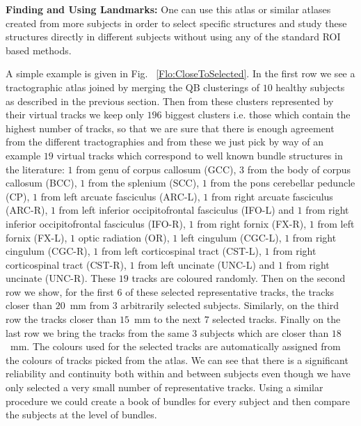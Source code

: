 \documentclass[preprint,authoryear,a4paper,10pt,onecolumn]{elsarticle}
\begin{document}
\textbf{Finding and Using Landmarks:} One can use this atlas or similar
atlases created from more subjects in order to select specific
structures and study these structures directly in different subjects
without using any of the standard ROI based methods.

A simple example is given in Fig. ~\ref{Flo:CloseToSelected}. In the
first row we see a tractographic atlas joined by merging the QB
clusterings of $10$ healthy subjects as described in the previous
section. Then from these clusters represented by their virtual tracks we
keep only $196$ biggest clusters i.e. those which contain the highest
number of tracks, so that we are sure that there is enough agreement
from the different tractographies and from these we just pick by way of
an example $19$ virtual tracks which correspond to well known bundle
structures in the literature: $1$ from genu of corpus callosum (GCC),
$3$ from the body of corpus callosum (BCC), $1$ from the splenium (SCC),
$1$ from the pons cerebellar peduncle (CP), $1$ from left arcuate
fasciculus (ARC-L), $1$ from right arcuate fasciculus (ARC-R), $1$ from
left inferior occipitofrontal fasciculus (IFO-L) and $1$ from right
inferior occipitofrontal fasciculus (IFO-R), $1$ from right fornix
(FX-R), $1$ from left fornix (FX-L), $1$ optic radiation (OR), $1$ left
cingulum (CGC-L), $1$ from right cingulum (CGC-R), $1$ from left
corticospinal tract (CST-L), $1$ from right corticospinal tract (CST-R),
$1$ from left uncinate (UNC-L) and $1$ from right uncinate
(UNC-R). These $19$ tracks are coloured randomly. Then on the second row
we show, for the first $6$ of these selected representative tracks, the
tracks closer than $20$~mm from $3$ arbitrarily selected
subjects. Similarly, on the third row the tracks closer than $15$~mm to
the next $7$ selected tracks. Finally on the last row we bring the
tracks from the same $3$ subjects which are closer than $18$~mm.  The
colours used for the selected tracks are automatically assigned from the
colours of tracks picked from the atlas. We can see that there is a
significant reliability and continuity both within and between subjects
even though we have only selected a very small number of representative
tracks. Using a similar procedure we could create a book of bundles for
every subject and then compare the subjects at the level of bundles.
\end{document}

